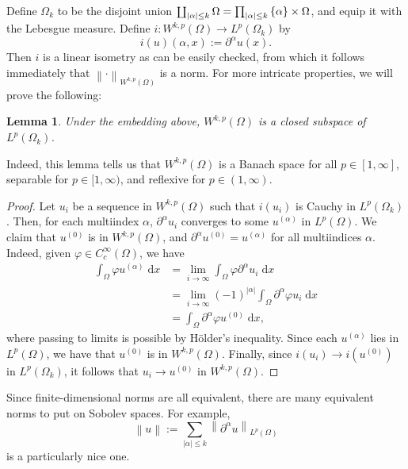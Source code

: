 \documentclass{book}
\renewcommand{\d}{\mathrm{d}}
\renewcommand{\phi}{\varphi}
\newcommand{\abs}[1]{\left\lvert {#1} \right\rvert}
\newcommand{\norm}[1]{\left\lVert {#1} \right\rVert}
\newcommand{\set}[1]{\left\{ {#1} \right\}}
\DeclareRobustCommand{\coprod}{\mathop{\text{\fakecoprod}}}
\newcommand{\fakecoprod}{%
  \sbox0{$\prod$}%
  \smash{\raisebox{\dimexpr.9625\depth-\dp0}{\scalebox{1}[-1]{$\prod$}}}%
  \vphantom{$\prod$}%
}
\newtheorem{lemma}[theorem]{Lemma}
\theoremstyle{definition}
\numberwithin{equation}{chapter}
\begin{document}
Define $\Omega_k$ to be the disjoint union $\coprod_{\abs{\alpha} \leq k} \Omega = \prod_{\abs{\alpha} \leq k} \set{\alpha} \times \Omega$, and equip it with the Lebesgue measure. Define $i \colon W^{k,p}(\Omega) \to L^p(\Omega_k)$ by 
\begin{equation}
    i(u)(\alpha,x) := \partial^\alpha u(x).
\end{equation}
Then $i$ is a linear isometry as can be easily checked, from which it follows immediately that $\norm{\cdot}_{W^{k,p}(\Omega)}$ is a norm. For more intricate properties, we will prove the following:
\begin{lemma}
    Under the embedding above, $W^{k,p}(\Omega)$ is a closed subspace of $L^p(\Omega_k)$.
\end{lemma}
Indeed, this lemma tells us that $W^{k,p}(\Omega)$ is a Banach space for all $p \in [1,\infty]$, separable for $p \in [1,\infty)$, and reflexive for $p \in (1,\infty)$.
\begin{proof}
    Let $u_i$ be a sequence in $W^{k,p}(\Omega)$ such that $i(u_i)$ is Cauchy in $L^p(\Omega_k)$. Then, for each multiindex $\alpha$, $\partial^\alpha u_i$ converges to some $u^{(\alpha)}$ in $L^p(\Omega)$. We claim that $u^{(0)}$ is in $W^{k,p}(\Omega)$, and $\partial^\alpha u^{(0)} = u^{(\alpha)}$ for all multiindices $\alpha$. Indeed, given $\phi \in C_c^\infty(\Omega)$, we have 
    \begin{equation} \begin{aligned}
        \int_\Omega \phi u^{(\alpha)} \; \d{x} 
        &= \lim_{i \to \infty} \int_\Omega \phi \partial^\alpha u_i \; \d{x} \\
        &= \lim_{i \to \infty} (-1)^{\abs{\alpha}} \int_\Omega \partial^\alpha{\phi} u_i \; \d{x} \\
        &= \int_\Omega \partial^\alpha{\phi} u^{(0)} \; \d{x},
    \end{aligned} \end{equation}
    where passing to limits is possible by H\"older's inequality. Since each $u^{(\alpha)}$ lies in $L^p(\Omega)$, we have that $u^{(0)}$ is in $W^{k,p}(\Omega)$. Finally, since $i(u_i) \to i(u^{(0)})$ in $L^p(\Omega_k)$, it follows that $u_i \to u^{(0)}$ in $W^{k,p}(\Omega)$.
\end{proof}
Since finite-dimensional norms are all equivalent, there are many equivalent norms to put on Sobolev spaces. For example,
\begin{equation}
    \norm{u} := \sum_{\abs{\alpha} \leq k} \norm{\partial^\alpha u}_{L^p(\Omega)}
\end{equation}
is a particularly nice one.
\end{document}

